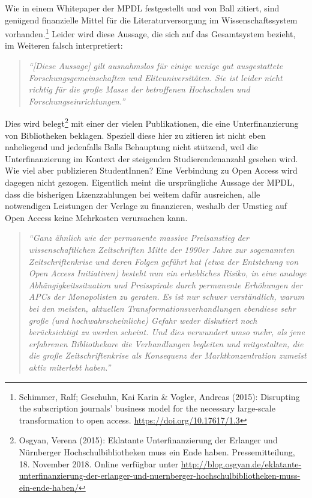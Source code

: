 \documentclass[a4paper,
fontsize=11pt,
oneside,
numbers=noperiodatend,
parskip=half-,
bibliography=totoc,
final
]{scrartcl}
\begin{document}
Wie in einem Whitepaper der MPDL festgestellt und von Ball zitiert, sind
genügend finanzielle Mittel für die Literaturversorgung im
Wissenschaftssystem vorhanden.\footnote{Schimmer, Ralf; Geschuhn, Kai
  Karin \& Vogler, Andreas (2015): Disrupting the subscription journals'
  business model for the necessary large-scale transformation to open
  access. \url{https://doi.org/10.17617/1.3}} Leider wird diese Aussage,
die sich auf das Gesamtsystem bezieht, im Weiteren falsch interpretiert:

\begin{quote}
\emph{\enquote{{[}Diese Aussage{]} gilt ausnahmslos für einige wenige
gut ausgestattete Forschungsgemeinschaften und Eliteuniversitäten. Sie
ist leider nicht richtig für die große Masse der betroffenen Hochschulen
und Forschungseinrichtungen.}}
\end{quote}

Dies wird belegt\footnote{Osgyan, Verena (2015): Eklatante
  Unterfinanzierung der Erlanger und Nürnberger Hochschulbibliotheken
  muss ein Ende haben. Pressemitteilung, 18. November 2018. Online
  verfügbar unter
  \url{http://blog.osgyan.de/eklatante-unterfinanzierung-der-erlanger-und-nuernberger-hochschulbibliotheken-muss-ein-ende-haben/}}
mit einer der vielen Publikationen, die eine Unterfinanzierung von
Bibliotheken beklagen. Speziell diese hier zu zitieren ist nicht eben
naheliegend und jedenfalls Balls Behauptung nicht stützend, weil die
Unterfinanzierung im Kontext der steigenden Studierendenanzahl gesehen
wird. Wie viel aber publizieren StudentInnen? Eine Verbindung zu Open
Access wird dagegen nicht gezogen. Eigentlich meint die ursprüngliche
Aussage der MPDL, dass die bisherigen Lizenzzahlungen bei weitem dafür
ausreichen, alle notwendigen Leistungen der Verlage zu finanzieren,
weshalb der Umstieg auf Open Access keine Mehrkosten verursachen kann.

\begin{quote}
\emph{\enquote{Ganz ähnlich wie der permanente massive Preisanstieg der
wissenschaftlichen Zeitschriften Mitte der 1990er Jahre zur sogenannten
Zeitschriftenkrise und deren Folgen geführt hat (etwa der Entstehung von
Open Access Initiativen) besteht nun ein erhebliches Risiko, in eine
analoge Abhängigkeitssituation und Preisspirale durch permanente
Erhöhungen der APCs der Monopolisten zu geraten. Es ist nur schwer
verständlich, warum bei den meisten, aktuellen
Transformationsverhandlungen ebendiese sehr große (und
hochwahrscheinliche) Gefahr weder diskutiert noch berücksichtigt zu
werden scheint. Und dies verwundert umso mehr, als jene erfahrenen
Bibliothekare die Verhandlungen begleiten und mitgestalten, die die
große Zeitschriftenkrise als Konsequenz der Marktkonzentration zumeist
aktiv miterlebt haben.}}
\end{quote}
\end{document}
